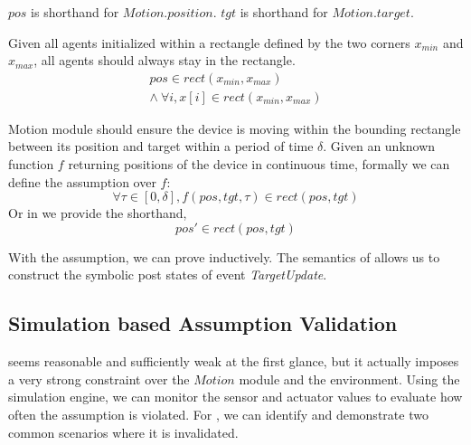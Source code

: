 $pos$ is shorthand for $Motion.position$. $tgt$ is shorthand for $Motion.target$.

\begin{invariant}\label{inv:lineform}
Given all agents initialized within a rectangle defined by the two corners $x_{min}$ and $x_{max}$,
all agents should always stay in the rectangle.
\[
\begin{split}
    pos \in rect(x_{min}, x_{max})        \\
    \land\ \forall i, x[i] \in rect(x_{min}, x_{max})
\end{split}
\]
\end{invariant}


\begin{assumption}\label{lineform-assume}
Motion module should ensure the device is moving within the bounding rectangle between its position and target
within a period of time $\delta$.
Given an unknown function $f$ returning positions of the device in continuous time,
formally we can define the assumption over $f$:
\[
\forall \tau \in [0, \delta], f(pos, tgt, \tau) \in rect(pos, tgt)
\]
Or in \lgname we provide the shorthand,
\[
pos' \in rect(pos, tgt)
\]
\end{assumption}

With the assumption, we can prove  inductively.
The \K semantics of \lgname allows us to construct the symbolic post states of event \emph{TargetUpdate}.


\begin{figure}
\end{figure}


\subsection{Simulation based Assumption Validation}

 seems reasonable and sufficiently weak at the first glance,
but it actually imposes a very strong constraint over the $Motion$ module and the environment.
Using the simulation engine, we can monitor the sensor and actuator values to evaluate how often the assumption is violated.
For , we can identify and demonstrate two common scenarios
where it is invalidated.

